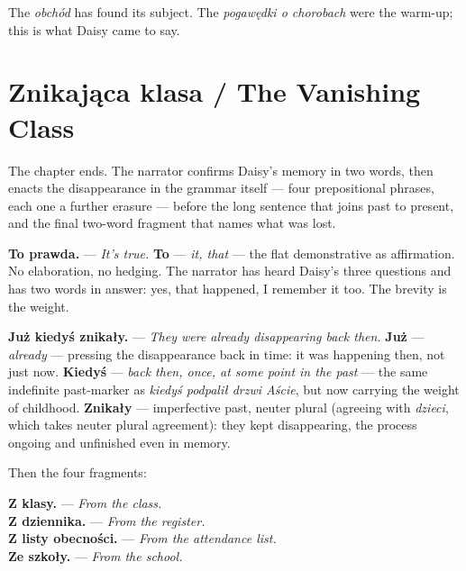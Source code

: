 The \textit{obchód} has found its subject. The
\textit{pogawędki o chorobach} were the warm-up;
this is what Daisy came to say.

\section{Znikająca klasa / The Vanishing Class}



The chapter ends. The narrator confirms Daisy's
memory in two words, then enacts the disappearance
in the grammar itself --- four prepositional phrases,
each one a further erasure --- before the long
sentence that joins past to present, and the final
two-word fragment that names what was lost.

\textbf{To prawda.} --- \textit{It's true.}
\textbf{To} --- \textit{it, that} --- the flat
demonstrative as affirmation. No elaboration, no
hedging. The narrator has heard Daisy's three
questions and has two words in answer: yes, that
happened, I remember it too. The brevity is the
weight.

\textbf{Już kiedyś znikały.} --- \textit{They were
already disappearing back then.} \textbf{Już} ---
\textit{already} --- pressing the disappearance
back in time: it was happening then, not just now.
\textbf{Kiedyś} --- \textit{back then, once, at
some point in the past} --- the same indefinite
past-marker as \textit{kiedyś podpalił drzwi Aście},
but now carrying the weight of childhood. \textbf{Znikały}
--- imperfective past, neuter plural (agreeing with
\textit{dzieci}, which takes neuter plural agreement):
they kept disappearing, the process ongoing and
unfinished even in memory.

\medskip

Then the four fragments:

\textbf{Z klasy.} --- \textit{From the class.}\\
\textbf{Z dziennika.} --- \textit{From the register.}\\
\textbf{Z listy obecności.} --- \textit{From the
attendance list.}\\
\textbf{Ze szkoły.} --- \textit{From the school.}

